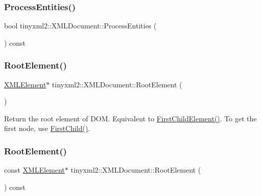 \subsubsection{\texorpdfstring{Process\+Entities()}{ProcessEntities()}}
{\footnotesize\ttfamily bool tinyxml2\+::\+X\+M\+L\+Document\+::\+Process\+Entities (\begin{DoxyParamCaption}{ }\end{DoxyParamCaption}) const\hspace{0.3cm}{\ttfamily [inline]}}

\mbox{\label{classtinyxml2_1_1_x_m_l_document_ad2b70320d3c2a071c2f36928edff3e1c}} 
\subsubsection{\texorpdfstring{Root\+Element()}{RootElement()}\hspace{0.1cm}{\footnotesize\ttfamily [1/2]}}
{\footnotesize\ttfamily \mbox{\hyperlink{classtinyxml2_1_1_x_m_l_element}{X\+M\+L\+Element}}$\ast$ tinyxml2\+::\+X\+M\+L\+Document\+::\+Root\+Element (\begin{DoxyParamCaption}{ }\end{DoxyParamCaption})\hspace{0.3cm}{\ttfamily [inline]}}

Return the root element of D\+OM. Equivalent to \mbox{\hyperlink{classtinyxml2_1_1_x_m_l_node_a1bec132dcf085284e0a10755f2cf0d57}{First\+Child\+Element()}}. To get the first node, use \mbox{\hyperlink{classtinyxml2_1_1_x_m_l_node_a2d6c70c475146b48bc93a7fafdeff5e0}{First\+Child()}}. \mbox{\label{classtinyxml2_1_1_x_m_l_document_a2be8ef9d6346bdef34311f91529afae4}} 
\subsubsection{\texorpdfstring{Root\+Element()}{RootElement()}\hspace{0.1cm}{\footnotesize\ttfamily [2/2]}}
{\footnotesize\ttfamily const \mbox{\hyperlink{classtinyxml2_1_1_x_m_l_element}{X\+M\+L\+Element}}$\ast$ tinyxml2\+::\+X\+M\+L\+Document\+::\+Root\+Element (\begin{DoxyParamCaption}{ }\end{DoxyParamCaption}) const\hspace{0.3cm}{\ttfamily [inline]}}

